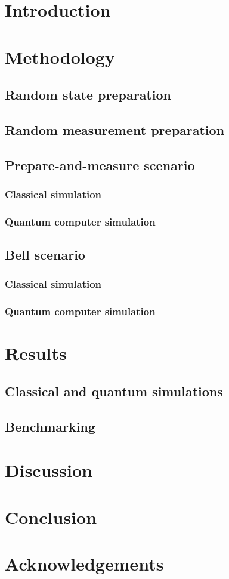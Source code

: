 \documentclass{article}
\begin{document}

\newpage

\newpage
\tableofcontents

\section{Introduction}
\section{Methodology}
\subsection{Random state preparation}
\subsection{Random measurement preparation}
\subsection{Prepare-and-measure scenario}
\subsubsection{Classical simulation}
\subsubsection{Quantum computer simulation}
\subsection{Bell scenario}
\subsubsection{Classical simulation}
\subsubsection{Quantum computer simulation}
\section{Results}
\subsection{Classical and quantum simulations}
\subsection{Benchmarking}
\section{Discussion}
\section{Conclusion}
\section{Acknowledgements}


\printbibliography
\end{document}
